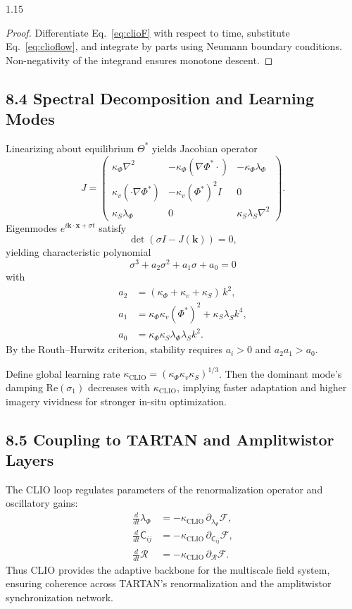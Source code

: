 \documentclass[12pt,a4paper]{article}
\begin{document}
\begin{spacing}{1.15}
\begin{proof}
Differentiate Eq.~\eqref{eq:clioF} with respect to time, substitute Eq.~\eqref{eq:clioflow}, and integrate by parts using Neumann boundary conditions.  Non-negativity of the integrand ensures monotone descent.
\end{proof}

\subsection{8.4 Spectral Decomposition and Learning Modes}

Linearizing about equilibrium $\Theta^\ast$ yields Jacobian operator
\[
J=\begin{pmatrix}
\kappa_\Phi\nabla^2 & -\kappa_\Phi(\nabla\Phi^\ast\cdot) & -\kappa_\Phi\lambda_\Phi\\[3pt]
\kappa_v(\cdot\nabla\Phi^\ast) & -\kappa_v(\Phi^\ast)^2 I & 0\\[3pt]
\kappa_S\lambda_\Phi & 0 & \kappa_S\lambda_S\nabla^2
\end{pmatrix}.
\]
Eigenmodes $e^{i\mathbf{k}\cdot\mathbf{x}+\sigma t}$ satisfy
\[
\det(\sigma I - J(\mathbf{k}))=0,
\]
yielding characteristic polynomial
\[
\sigma^3 + a_2\sigma^2 + a_1\sigma + a_0 = 0
\]
with
\begin{align*}
a_2 &= (\kappa_\Phi+\kappa_v+\kappa_S)\,k^2,\\
a_1 &= \kappa_\Phi\kappa_v(\Phi^\ast)^2 + \kappa_S\lambda_S k^4,\\
a_0 &= \kappa_\Phi\kappa_S\lambda_\Phi\lambda_S k^2.
\end{align*}
By the Routh–Hurwitz criterion, stability requires $a_i>0$ and $a_2 a_1> a_0$.

\begin{corollary}
Define global learning rate $\kappa_{\mathrm{CLIO}} = (\kappa_\Phi\kappa_v\kappa_S)^{1/3}$.  
Then the dominant mode’s damping $\mathrm{Re}(\sigma_1)$ decreases with $\kappa_{\mathrm{CLIO}}$, implying faster adaptation and higher imagery vividness for stronger in-situ optimization.
\end{corollary}

\subsection{8.5 Coupling to TARTAN and Amplitwistor Layers}

The CLIO loop regulates parameters of the renormalization operator and oscillatory gains:
\begin{align}
\frac{d}{dt}\lambda_\Phi &= -\kappa_{\mathrm{CLIO}}\,\partial_{\lambda_\Phi}\mathcal{F},\\
\frac{d}{dt}\mathsf{C}_{ij} &= -\kappa_{\mathrm{CLIO}}\,\partial_{\mathsf{C}_{ij}}\mathcal{F},\\
\frac{d}{dt}\mathcal{R} &= -\kappa_{\mathrm{CLIO}}\,\partial_{\mathcal{R}}\mathcal{F}.
\end{align}
Thus CLIO provides the adaptive backbone for the multiscale field system, ensuring coherence across TARTAN’s renormalization and the amplitwistor synchronization network.


\end{spacing}
\end{document}
